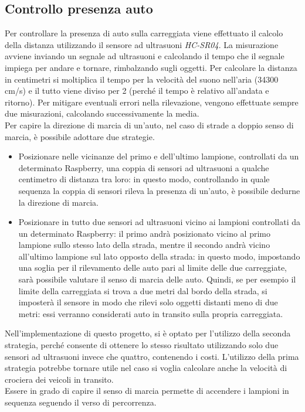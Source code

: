 \subsection{Controllo presenza auto \label{cpa}}
Per controllare la presenza di auto sulla carreggiata viene effettuato il calcolo della distanza utilizzando il sensore ad ultrasuoni \textit{HC-SR04}.
La misurazione avviene inviando un segnale ad ultrasuoni e calcolando il tempo che il segnale impiega per andare e tornare, rimbalzando sugli oggetti.
Per calcolare la distanza in centimetri si moltiplica il tempo per la velocità del suono nell'aria (34300 cm/s) e il tutto viene diviso per 2 (perché il tempo è relativo all'andata e ritorno).
Per mitigare eventuali errori nella rilevazione, vengono effettuate sempre due misurazioni, calcolando successivamente la media.
\\Per capire la direzione di marcia di un'auto, nel caso di strade a doppio senso di marcia, è possibile adottare due strategie.
\begin{itemize}
 \item Posizionare nelle vicinanze del primo e dell'ultimo lampione, controllati da un determinato Raspberry, una coppia di sensori ad ultrasuoni a qualche centimetro di distanza tra loro: in questo modo, controllando in quale sequenza la coppia di sensori rileva la presenza di un'auto, è possibile dedurne la direzione di marcia.
 \item Posizionare in tutto due sensori ad ultrasuoni vicino ai lampioni controllati da un determinato Raspberry: il primo andrà posizionato vicino al primo lampione sullo stesso lato della strada, mentre il secondo andrà vicino all'ultimo lampione sul lato opposto della strada:
 in questo modo, impostando una soglia per il rilevamento delle auto pari al limite delle due carreggiate, sarà possibile valutare il senso di marcia delle auto.
 Quindi, se per esempio il limite della carreggiata si trova a due metri dal bordo della strada, si imposterà il sensore in modo che rilevi solo oggetti distanti meno di due metri: essi verranno considerati auto in transito sulla propria carreggiata.
\end{itemize}
Nell'implementazione di questo progetto, si è optato per l'utilizzo della seconda strategia, perché consente di ottenere lo stesso risultato utilizzando solo due sensori ad ultrasuoni invece che quattro, contenendo i costi.
L'utilizzo della prima strategia potrebbe tornare utile nel caso si voglia calcolare anche la velocità di crociera dei veicoli in transito.
\\Essere in grado di capire il senso di marcia permette di accendere i lampioni in sequenza seguendo il verso di percorrenza.
